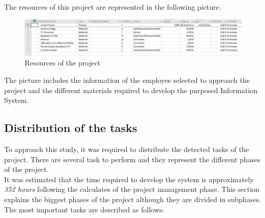 The resources of this project are represented in the following picture.

\begin{figure}[H]
\begin{centering}
\includegraphics[scale=0.5]{IMGS/resources_project.PNG}
\caption{Resources of the project \label{Resources of the project}}
\end{centering}
\end{figure}

The picture includes the information of the employee selected to approach the project and the different materials required to develop the purposed Information System.

\subsection{Distribution of the tasks}

To approach this study, it was required to distribute the detected tasks of the project. There are several task to perform and they represent the different phases of the project.\\

It was estimated that the time required to develop the system is approximately \textit{352 hours} following the calculates of the project management phase. This section explains the biggest phases of the project although they are divided in subphases. The most important tasks are described as follows:

